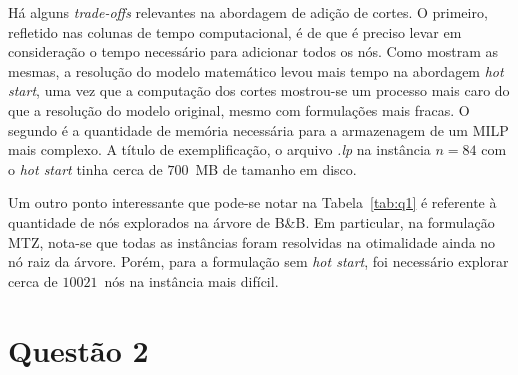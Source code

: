 \documentclass{article}
\begin{document}
Há alguns \textit{trade-offs} relevantes na abordagem de adição de cortes. 
O primeiro, refletido nas colunas de tempo computacional, é de que é preciso levar em consideração o tempo necessário para adicionar todos os nós.
Como mostram as mesmas, a resolução do modelo matemático levou mais tempo na abordagem \textsl{hot start}, uma vez que a computação dos cortes mostrou-se um processo mais caro do que a resolução do modelo original, mesmo com formulações mais fracas.
O segundo é a quantidade de memória necessária para a armazenagem de um MILP mais complexo.
A título de exemplificação, o arquivo \textsl{.lp} na instância $n = 84$ com o \textsl{hot start} tinha cerca de $700$~MB de tamanho em disco.

Um outro ponto interessante que pode-se notar na Tabela~\ref{tab:q1} é referente à quantidade de nós explorados na árvore de B\&B.
Em particular, na formulação MTZ, nota-se que todas as instâncias foram resolvidas na otimalidade ainda no nó raiz da árvore.
Porém, para a formulação sem \textsl{hot start}, foi necessário explorar cerca de $10021$~nós na instância mais difícil.

\section{Questão 2}
\end{document}
